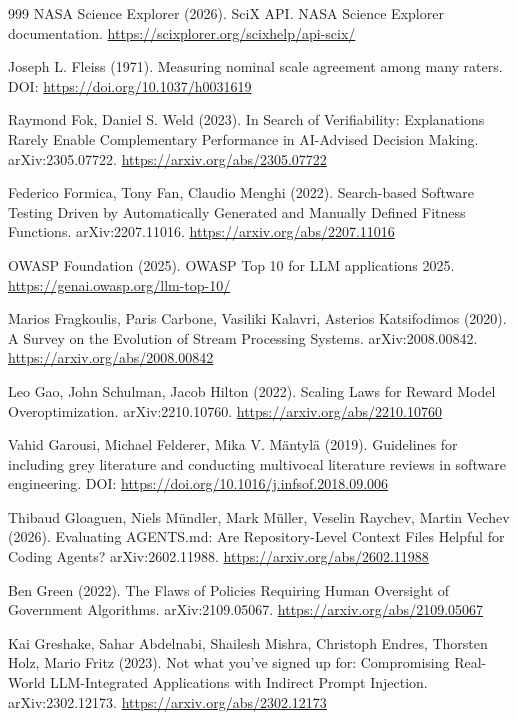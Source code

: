 \begin{thebibliography}{999}
 NASA Science Explorer (2026). SciX API. NASA Science Explorer documentation. \url{https://scixplorer.org/scixhelp/api-scix/}

 Joseph L. Fleiss (1971). Measuring nominal scale agreement among many raters. DOI: \url{https://doi.org/10.1037/h0031619}

 Raymond Fok, Daniel S. Weld (2023). In Search of Verifiability: Explanations Rarely Enable Complementary Performance in AI-Advised Decision Making. arXiv:2305.07722. \url{https://arxiv.org/abs/2305.07722}

 Federico Formica, Tony Fan, Claudio Menghi (2022). Search-based Software Testing Driven by Automatically Generated and Manually Defined Fitness Functions. arXiv:2207.11016. \url{https://arxiv.org/abs/2207.11016}

 OWASP Foundation (2025). OWASP Top 10 for LLM applications 2025. \url{https://genai.owasp.org/llm-top-10/}

 Marios Fragkoulis, Paris Carbone, Vasiliki Kalavri, Asterios Katsifodimos (2020). A Survey on the Evolution of Stream Processing Systems. arXiv:2008.00842. \url{https://arxiv.org/abs/2008.00842}

 Leo Gao, John Schulman, Jacob Hilton (2022). Scaling Laws for Reward Model Overoptimization. arXiv:2210.10760. \url{https://arxiv.org/abs/2210.10760}

 Vahid Garousi, Michael Felderer, Mika V. Mäntylä (2019). Guidelines for including grey literature and conducting multivocal literature reviews in software engineering. DOI: \url{https://doi.org/10.1016/j.infsof.2018.09.006}

 Thibaud Gloaguen, Niels M\"{u}ndler, Mark M\"{u}ller, Veselin Raychev, Martin Vechev (2026). Evaluating AGENTS.md: Are Repository-Level Context Files Helpful for Coding Agents? arXiv:2602.11988. \url{https://arxiv.org/abs/2602.11988}

 Ben Green (2022). The Flaws of Policies Requiring Human Oversight of Government Algorithms. arXiv:2109.05067. \url{https://arxiv.org/abs/2109.05067}

 Kai Greshake, Sahar Abdelnabi, Shailesh Mishra, Christoph Endres, Thorsten Holz, Mario Fritz (2023). Not what you've signed up for: Compromising Real-World LLM-Integrated Applications with Indirect Prompt Injection. arXiv:2302.12173. \url{https://arxiv.org/abs/2302.12173}


\end{thebibliography}
